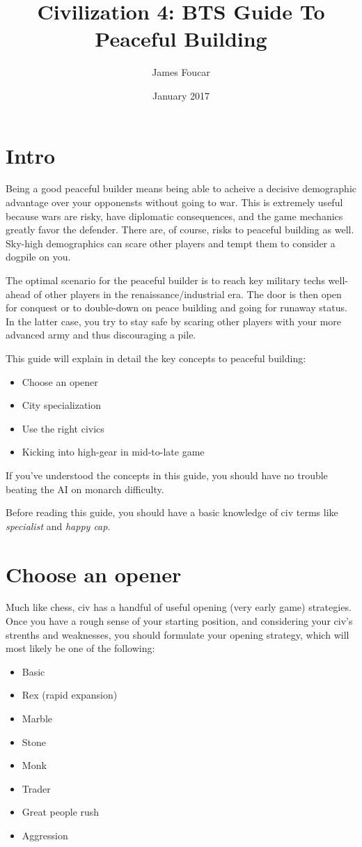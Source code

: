 \documentclass[10pt]{article}
\title{Civilization 4: BTS Guide To Peaceful Building}
\author{James Foucar}
\date{January 2017}
\begin{document}
\section*{Intro}

Being a good peaceful builder means being able to acheive a decisive demographic advantage
over your opponensts without going to war. This is extremely useful because wars are risky, have
diplomatic consequences, and the game mechanics greatly favor the defender. There are, of course,
risks to peaceful building as well. Sky-high demographics can scare other players and tempt them
to consider a dogpile on you.

The optimal scenario for the peaceful builder is to reach key military
techs well-ahead of other players in the renaissance/industrial era. The door is then open for conquest
or to double-down on peace building and going for runaway status. In the latter case, you try to stay
safe by scaring other players with your more advanced army and thus discouraging a pile.

This guide will explain in detail the key concepts to peaceful building:
\begin{itemize}
\item Choose an opener
\item City specialization
\item Use the right civics
\item Kicking into high-gear in mid-to-late game
\end{itemize}

If you've understood the concepts in this guide, you should have no trouble beating the AI
on monarch difficulty.

Before reading this guide, you should have a basic knowledge of civ terms like \emph{specialist}
and \emph{happy cap}.

\section*{Choose an opener}

Much like chess, civ has a handful of useful opening (very early game) strategies. Once you
have a rough sense of your starting position, and considering your civ's strenths and weaknesses,
you should formulate your opening strategy, which will most likely be one of the following:
\begin{itemize}
\item Basic
\item Rex (rapid expansion)
\item Marble
\item Stone
\item Monk
\item Trader
\item Great people rush
\item Aggression
\end{itemize}
\end{document}
